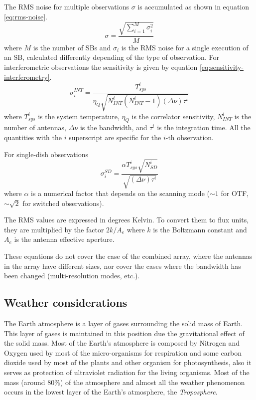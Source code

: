 The RMS noise for multiple observations $\sigma$ is accumulated as shown in equation \ref{eq:rms-noise}.
\begin{equation}
\label{eq:rms-noise}
\sigma = \frac{\sqrt{\sum_{i=1}^M \sigma_i^2}}{M}
\end{equation}
where $M$ is the number of SBs and $\sigma_i$ is the RMS noise for a single
execution of an SB, calculated differently depending of the type of observation.
For interferometric observations the sensitivity is given by equation \ref{eq:sensitivity-interferometry}.
\begin{equation}
\label{eq:sensitivity-interferometry}
\sigma_i^{INT} = \frac{T_{sys}^i}{\eta_Q \sqrt{N_{INT}^i(N_{INT}^i-1)(\Delta\nu)\tau^i}}
\end{equation}
where $T_{sys}^i$ is the system temperature, $\eta_Q$ is the correlator sensitivity,
$N_{INT}^i$ is the number of antennas, $\Delta\nu$ is the bandwidth, and $\tau^i$ is
the integration time. All the quantities with the $i$ superscript are specific for the $i$-th
observation.

For single-dish observations
\begin{equation}
\sigma_i^{SD} = \frac{\alpha T_{sys}^i \sqrt{N_{SD}^i}}{\sqrt{(\Delta\nu)\tau^i}}
\end{equation}
where $\alpha$ is a numerical factor that depends on the scanning mode ($\sim 1$ for OTF,
$\sim \sqrt{2}$ for switched observations).

The RMS values are expressed in degrees Kelvin. To convert them to flux units, they are multiplied by the factor $2k/A_e$ where $k$ is the Boltzmann constant and $A_e$ is the antenna effective aperture.

These equations do not cover the case of the combined array, where the antennas in the array have different sizes, nor cover the cases where the bandwidth has been changed (multi-resolution modes, etc.).

\subsection{Weather considerations}

The Earth atmosphere is a layer of gases surrounding the solid mass of Earth. This layer of gases is maintained in this position due the gravitational effect of the solid mass. Most of the Earth's atmosphere is composed by Nitrogen and Oxygen used by most of the micro-organisms for respiration and some carbon dioxide used by most of the plants and other organism for photosynthesis,	also it serves as protection of ultraviolet radiation for the living organisms. Most of the mass (around $80\%$) of the atmosphere and almost all the weather phenomenon occurs in the lowest layer of the Earth's atmosphere, the \textit{Troposphere}.

